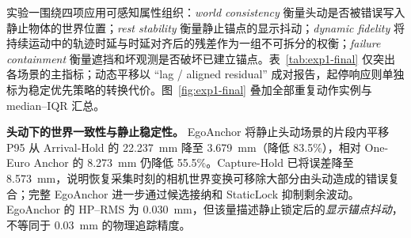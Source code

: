 \documentclass[review]{vgtc}
\begin{document}
实验一围绕四项应用可感知属性组织：\emph{world consistency} 衡量头动是否被错误写入静止物体的世界位置；\emph{rest stability} 衡量静止锚点的显示抖动；\emph{dynamic fidelity} 将持续运动中的轨迹时延与时延对齐后的残差作为一组不可拆分的权衡；\emph{failure containment} 衡量遮挡和坏观测是否破坏已建立锚点。表~\ref{tab:exp1-final} 仅突出各场景的主指标；动态平移以 ``lag / aligned residual'' 成对报告，起停响应则单独标为稳定优先策略的转换代价。图~\ref{fig:exp1-final} 叠加全部重复动作实例与 median--IQR 汇总。

\begin{table}[t]
\centering
\caption{实验一的片段级系统表征，数值为重复动作片段或遮挡过程的 median。粗体仅标记各应用能力的主指标最优值；动态平移中的有效时延与 lag-aligned residual 必须联合解释，其中仅突出 residual。最右列是稳定优先策略的\emph{转换代价}，不参与主收益排名。完整 IQR 与片段分布见图~\ref{fig:exp1-final}。}
\label{tab:exp1-final}
\scriptsize
\setlength{\tabcolsep}{4.2pt}
\end{table}

\textbf{头动下的世界一致性与静止稳定性。}
EgoAnchor 将静止头动场景的片段内平移 P95 从 Arrival-Hold 的 22.237~mm 降至 3.679~mm（降低 83.5\%），相对 One-Euro Anchor 的 8.273~mm 仍降低 55.5\%。Capture-Hold 已将误差降至 8.573~mm，说明恢复采集时刻的相机世界变换可移除大部分由头动造成的错误复合；完整 EgoAnchor 进一步通过候选接纳和 StaticLock 抑制剩余波动。EgoAnchor 的 HP--RMS 为 0.030~mm，但该量描述静止锁定后的\emph{显示锚点抖动}，不等同于 0.03~mm 的物理追踪精度。
\end{document}
